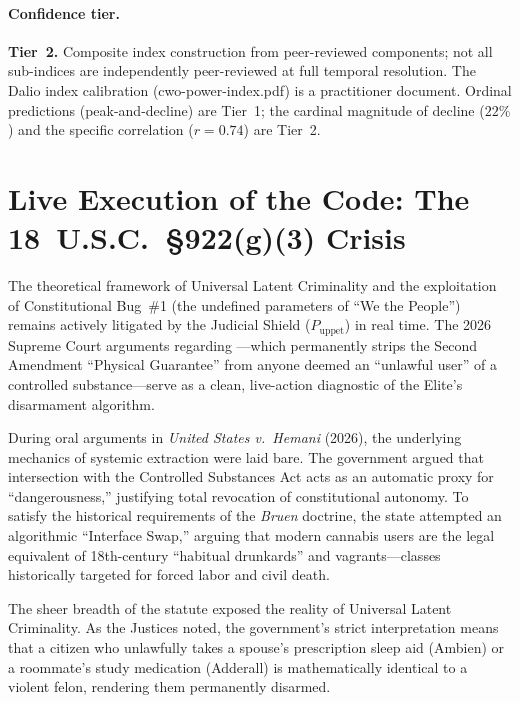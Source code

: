 \paragraph{Confidence tier.} \textbf{Tier~2.} Composite index construction from peer-reviewed components; not all sub-indices are independently peer-reviewed at full temporal resolution. The Dalio index calibration (cwo-power-index.pdf) is a practitioner document. Ordinal predictions (peak-and-decline) are Tier~1; the cardinal magnitude of decline ($22\%$) and the specific correlation ($r = 0.74$) are Tier~2.

\section{Live Execution of the Code: The 18~U.S.C.~\S922(g)(3) Crisis}

The theoretical framework of Universal Latent Criminality and the exploitation of Constitutional Bug~\#1 (the undefined parameters of ``We the People'') remains actively litigated by the Judicial Shield ($P_{\text{uppet}}$) in real time. The 2026 Supreme Court arguments regarding ---which permanently strips the Second Amendment ``Physical Guarantee'' from anyone deemed an ``unlawful user'' of a controlled substance---serve as a clean, live-action diagnostic of the Elite's disarmament algorithm.


During oral arguments in \textit{United States v.\ Hemani} (2026), the underlying mechanics of systemic extraction were laid bare. The government argued that intersection with the Controlled Substances Act acts as an automatic proxy for ``dangerousness,'' justifying total revocation of constitutional autonomy. To satisfy the historical requirements of the \textit{Bruen} doctrine, the state attempted an algorithmic ``Interface Swap,'' arguing that modern cannabis users are the legal equivalent of 18th-century ``habitual drunkards'' and vagrants---classes historically targeted for forced labor and civil death.

The sheer breadth of the statute exposed the reality of Universal Latent Criminality. As the Justices noted, the government's strict interpretation means that a citizen who unlawfully takes a spouse's prescription sleep aid (Ambien) or a roommate's study medication (Adderall) is mathematically identical to a violent felon, rendering them permanently disarmed.

